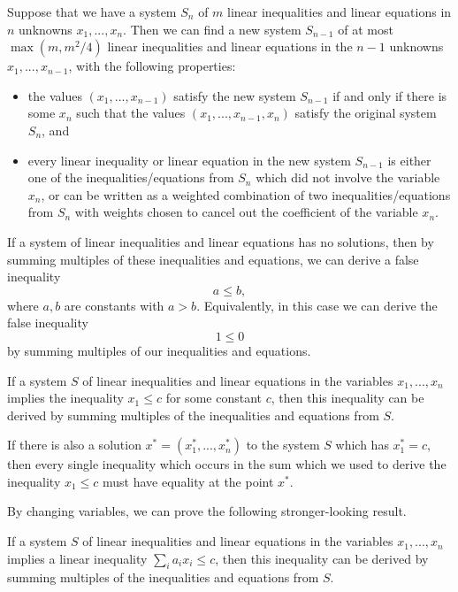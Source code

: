 \begin{thm} Suppose that we have a system $S_n$ of $m$ linear inequalities and linear equations in $n$ unknowns $x_1, ..., x_n$. Then we can find a new system $S_{n-1}$ of at most $\max(m, m^2/4)$ linear inequalities and linear equations in the $n-1$ unknowns $x_1, ..., x_{n-1}$, with the following properties:
\begin{itemize}
\item the values $(x_1, ..., x_{n-1})$ satisfy the new system $S_{n-1}$ if and only if there is some $x_n$ such that the values $(x_1, ..., x_{n-1}, x_n)$ satisfy the original system $S_n$, and

\item every linear inequality or linear equation in the new system $S_{n-1}$ is either one of the inequalities/equations from $S_n$ which did not involve the variable $x_n$, or can be written as a weighted combination of two inequalities/equations from $S_n$ with weights chosen to cancel out the coefficient of the variable $x_n$.
\end{itemize}
\end{thm}

\begin{cor} If a system of linear inequalities and linear equations has no solutions, then by summing multiples of these inequalities and equations, we can derive a false inequality
\[
a \le b,
\]
where $a,b$ are constants with $a > b$. Equivalently, in this case we can derive the false inequality
\[
1 \le 0
\]
by summing multiples of our inequalities and equations.
\end{cor}

\begin{cor} If a system $S$ of linear inequalities and linear equations in the variables $x_1, ..., x_n$ implies the inequality $x_1 \le c$ for some constant $c$, then this inequality can be derived by summing multiples of the inequalities and equations from $S$.

If there is also a solution $x^* = (x_1^*, ..., x_n^*)$ to the system $S$ which has $x_1^* = c$, then every single inequality which occurs in the sum which we used to derive the inequality $x_1 \le c$ must have equality at the point $x^*$.
\end{cor}

By changing variables, we can prove the following stronger-looking result.

\begin{cor} If a system $S$ of linear inequalities and linear equations in the variables $x_1, ..., x_n$ implies a linear inequality $\sum_i a_i x_i \le c$, then this inequality can be derived by summing multiples of the inequalities and equations from $S$.
\end{cor}

